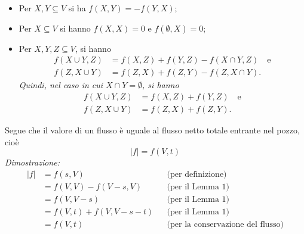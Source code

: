 \begin{itemize}
    \item Per $X, Y \subseteq V$ si ha $f(X, Y) = -f(Y, X)$;
    
    \item Per $X \subseteq V$ si hanno $f(X, X) = 0$ e $f(\emptyset, X) = 0$;
    
    \item Per $X, Y, Z \subseteq V$, si hanno
    \begin{align*}
        f(X \cup Y, Z) &= f(X, Z) + f(Y, Z) - f(X \cap Y, Z) \quad \text{e} \\
        f(Z, X \cup Y) &= f(Z, X) + f(Z, Y) - f(Z, X \cap Y).
    \end{align*}
    \textit{Quindi, nel caso in cui $X \cap Y = \emptyset$, si hanno}
    \begin{align*}
        f(X \cup Y, Z) &= f(X, Z) + f(Y, Z) \quad \text{e} \\
        f(Z, X \cup Y) &= f(Z, X) + f(Z, Y).
    \end{align*}
\end{itemize}
Segue che il valore di un flusso è uguale al flusso netto totale entrante nel pozzo, cioè
\[|f| = f(V, t)\]
\textit{Dimostrazione:}\\
\begin{align*}
|f| &= f(s, V) && \text{(per definizione)} \\
    &= f(V, V) - f(V - s, V) && \text{(per il Lemma 1)} \\
    &= f(V, V - s) && \text{(per il Lemma 1)} \\
    &= f(V, t) + f(V, V - s - t) && \text{(per il Lemma 1)} \\
    &= f(V, t) && \text{(per la conservazione del flusso)}
\end{align*}
